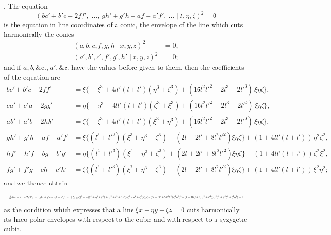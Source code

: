 \documentclass[11pt]{article}
\begin{document}
. The equation
\[
(b c' + b' c - 2 f f',\; \ldots,\; g h' + g' h - a f - a' f',\; \ldots \mid \xi, \eta, \zeta)^2 = 0
\]
is the equation in line coordinates of a conic, the envelope of the line which cuts harmonically the conics
\begin{align*}
(a, b, c, f, g, h \mid x, y, z)^2 &= 0, \\
(a', b', c', f', g', h' \mid x, y, z)^2 &= 0;
\end{align*}
and if $a, b, \&\text{c.}$, $a', \&\text{c.}$ have the values before given to them, then the coefficients of the equation are
\begin{align*}
b c' + b' c - 2 f f' &= \xi\bigl\{-\xi^3 + 4 l l'(l + l')(\eta^3 + \zeta^3) + (16 l^2 l'^2 - 2 l^3 - 2 l'^3)\,\xi\eta\zeta\bigr\}, \\
c a' + c' a - 2 g g' &= \eta\bigl\{-\eta^3 + 4 l l'(l + l')(\zeta^3 + \xi^3) + (16 l^2 l'^2 - 2 l^3 - 2 l'^3)\,\xi\eta\zeta\bigr\}, \\
a b' + a' b - 2 h h' &= \zeta\bigl\{-\zeta^3 + 4 l l'(l + l')(\xi^3 + \eta^3) + (16 l^2 l'^2 - 2 l^3 - 2 l'^3)\,\xi\eta\zeta\bigr\}, \\
g h' + g' h - a f - a' f' &= \xi\bigl\{(l^3 + l'^3)(\xi^3 + \eta^3 + \zeta^3) + (2 l + 2 l' + 8 l^2 l'^2)\xi\eta\zeta\bigr\} + (1 + 4 l l'(l + l'))\,\eta^2 \zeta^2, \\
h f' + h' f - b g - b' g' &= \eta\bigl\{(l^3 + l'^3)(\xi^3 + \eta^3 + \zeta^3) + (2 l + 2 l' + 8 l^2 l'^2)\xi\eta\zeta\bigr\} + (1 + 4 l l'(l + l'))\,\zeta^2 \xi^2, \\
f g' + f' g - c h - c' h' &= \zeta\bigl\{(l^3 + l'^3)(\xi^3 + \eta^3 + \zeta^3) + (2 l + 2 l' + 8 l^2 l'^2)\xi\eta\zeta\bigr\} + (1 + 4 l l'(l + l'))\,\xi^2 \eta^2;
\end{align*}
and we thence obtain
\[
\resizebox{\textwidth}{!}{$\displaystyle \tfrac{1}{l l'}\bigl(b c' + b' c - 2 f f',\; \ldots,\; g h' + g' h - a f - a' f',\; \ldots \mid \xi, \eta, \zeta\bigr)^2 = -(\xi^4 + \eta^4 + \zeta^4) + (l^2 + l'^2 + 1 l l')(\xi^3 + \eta^3 + \zeta^3)\xi\eta\zeta + (6 l + 6 l' + 24 l^2 l'^2)\,\xi^2 \eta^2 \zeta^2 + (4 + 16(l + l')(l^2 + l'^2))(y^2 \zeta^2 + \zeta^2 \xi^2 + \xi^2 \eta^2) = 0$}
\]
as the condition which expresses that a line $\xi x + \eta y + \zeta z = 0$ cuts harmonically its lineo-polar envelopes with respect to the cubic and with respect to a syzygetic cubic.

\medskip
\end{document}
